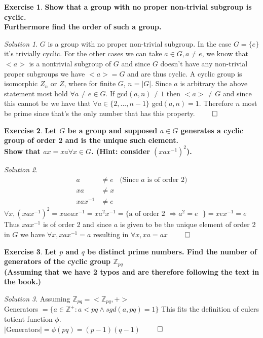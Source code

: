 \documentclass[a4paper,twoside=false,abstract=false,numbers=noenddot,
titlepage=false,headings=small,parskip=half,version=last]{scrartcl}
\theoremstyle{definition}
\newtheorem{exercise}{Exercise}
\theoremstyle{remark}
\newtheorem*{solution}{Solution}
\newcommand{\ZZ}{\ensuremath{\mathbb{Z}}}
\begin{document}
\begin{exercise}
{\bf
Show that a group with no proper non-trivial subgroup is cyclic.\\
Furthermore find the order of such a group.
}
\end{exercise}
\begin{solution}
$G$ is a group with no proper non-trivial subgroup. In the case $G=\{e\}$ it's trivially cyclic. 
For the other cases we can take $a \in G,a \neq e$, we know that $<a>$ is a nontrivial subgroup of $G$ 
and since $G$ doesn't have any non-trivial proper subgroups we have $<a>=G$ and are thus cyclic.
A cyclic group is isomorphic $Z_n$ or $Z$, where for finite $G$, $n=|G|$. Since $a$ is arbitrary the 
above statement most hold $\forall a \neq e \in G$. If gcd$(a,n) \neq 1$ 
then $<a> \neq G$ and since this cannot be we have that $\forall a \in \{2,...,n-1\}$ gcd$(a,n)=1$. Therefore $n$ most be prime since that's the only number that has this property. $\qed$

\end{solution}


\begin{exercise}
{\bf
Let $G$ be a group and supposed $a \in G$ generates a cyclic group of order 2 and is the unique such  element. \\
Show that $ax=xa \forall x \in G$. (Hint: consider $(xax^{-1})^2$).
}
\end{exercise}
\begin{solution}

\begin{align*}
    a &\neq e & \mbox{(Since $a$ is of order 2)} \\
    xa &\neq x & \\
    xax^{-1} &\neq e
\end{align*}
$\forall x, (xax^{-1})^2 = xaeax^{-1} = xa^2x^{-1} = \{\mbox{a of order 2 $\Rightarrow a^2 = e$ }\} = xex^{-1} = e$ \\
Thus $xax^{-1}$ is of order 2 and since $a$ is given to be the unique element of order 2 in $G$ 
we have $\forall x, xax^{-1}=a$ resulting in $\forall x, xa=ax$ $\qed$
\end{solution}

\begin{exercise}
{\bf
Let $p$ and $q$ be distinct prime numbers. Find the number of generators of the cyclic group $\ZZ_{pq}$ \\
(Assuming that we have 2 typos and are therefore following the text in the book.)
}
\end{exercise}
\begin{solution}
Assuming $\ZZ_{pq} = <\ZZ_{pq},+>$ \\
Generators $ = \{ a \in \ZZ^+ : a<pq \wedge sgd(a,pq)=1 \}$
This fits the definition of eulers totient function $\phi$.\\
$|$Generators$| = \phi(pq) = (p-1)(q-1)$
$\qed$
\end{solution}

\end{document}
